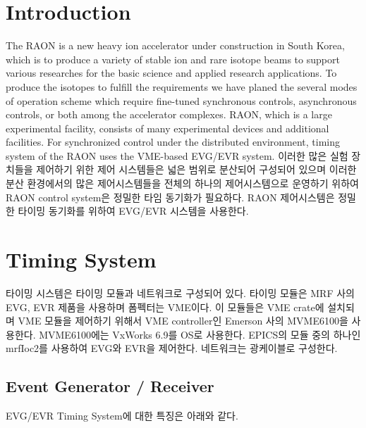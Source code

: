 \documentclass[11pt
-  , a4paper
  , article
  , oneside
]{memoir}
\begin{document}
\begin{multicols}{2}
	
	
\chapter{Introduction}
The RAON\cite{TSHOO:NIMB} is a new heavy ion accelerator under construction in South Korea, which is to produce a variety of stable ion and rare isotope beams to support various researches for the basic science and applied research applications. To produce the isotopes to fulfill the requirements we have planed the several modes of operation scheme which require fine-tuned synchronous controls, asynchronous controls, or both among the accelerator complexes. RAON, which is a large experimental facility, consists of many experimental devices and additional facilities. For synchronized control under the distributed environment, timing system of the RAON uses the VME-based EVG/EVR system. 
이러한 많은 실험 장치들을 제어하기 위한 제어 시스템들은 넓은 범위로 분산되어 구성되어 있으며 이러한 분산 환경에서의 많은 제어시스템들을 전체의 하나의 제어시스템으로 운영하기 위하여 RAON control system은 정밀한 타임 동기화가 필요하다. RAON 제어시스템은 정밀한 타이밍 동기화를 위하여 EVG/EVR 시스템을 사용한다. 

\chapter{Timing System}
타이밍 시스템은 타이밍 모듈과 네트워크로 구성되어 있다. 타이밍 모듈은 MRF 사의 EVG, EVR 제품을 사용하며 폼펙터는 VME이다. 이 모듈들은 VME crate에 설치되며 VME 모듈을 제어하기 위해서 VME controller인 Emerson 사의 MVME6100을 사용한다. MVME6100에는 VxWorks 6.9를 OS로 사용한다.
EPICS의 모듈 중의 하나인 mrfIoc2를 사용하여 EVG와 EVR을 제어한다. 네트워크는 광케이블로 구성한다. 
\section{Event Generator / Receiver}
EVG/EVR Timing System에 대한 특징은 아래와 같다.


\end{multicols}
\end{document}
